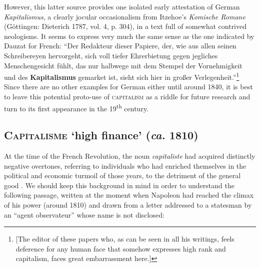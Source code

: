 \documentclass[output=paper]{langsci/langscibook}
\begin{document}
However, this latter source provides one isolated early attestation of
German \emph{Kapitalismus}, a clearly jocular occasionalism from
Itzehoe's \emph{Komische Romane} (Göttingen: Dieterich 1787, vol. 4, p.
304), in a text full of somewhat contrived neologisms. It seems to
express very much the same sense as the one indicated by Dauzat for
French: ``Der Redakteur dieser Papiere, der, wie aus allen seinen
Schreibereyen hervorgeht, sich voll tiefer Ehrerbietung gegen jegliches
Menschengesicht fühlt, das nur halbwege mit dem Stempel der
Vornehmigkeit und des \textbf{Kapitalismus} gemarket ist, sieht sich
hier in großer Verlegenheit.''\footnote{{[}The editor of these papers
  who, as can be seen in all his writings, feels deference for any human
  face that somehow expresses high rank and capitalism, faces great
  embarrassment here.{]}} Since there are no other examples for German
either until around 1840, it is best to leave this potential proto-use
of \textsc{capitalism} as a riddle for future research and turn to its first appearance
 in the 19\textsuperscript{th} century.

\subsection{\textsc{Capitalisme} `high finance' (\emph{ca.} 1810)}

At the time of the French Revolution, the noun \emph{capitaliste} had
acquired distinctly negative overtones, referring to individuals who had
enriched themselves in the political and economic turmoil of those
years, to the detriment of the general good %
\citep[see][]{Hoefer86}%
%
. We should keep this
background  in mind in order to understand the
following passage, written at the moment when Napoleon had reached the
climax of his power (around 1810) and drawn from a letter addressed to a
statesman by an ``agent observateur'' whose name is not disclosed:
\end{document}
